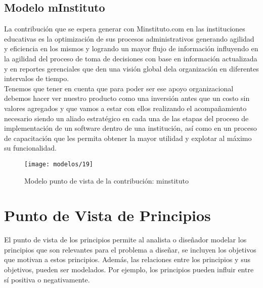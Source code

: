    \subsection{Modelo mInstituto}
  La contribución que se espera generar con Minstituto.com en las instituciones educativas es la optimización de sus procesos administrativos generando agilidad y eficiencia en los mismos y logrando un mayor flujo de información influyendo en la agilidad del proceso de toma de decisiones con base en información actualizada y en reportes gerenciales que den una visión global dela organización en diferentes intervalos de tiempo. \\
  
  Tenemos que tener en cuenta que para poder ser ese apoyo organizacional debemos hacer ver nuestro producto como una inversión antes que un costo sin valores agregados y que vamos a estar con ellos realizando el acompañamiento necesario siendo un aliado estratégico en cada una de las etapas del proceso de implementación de un software dentro de una institución, así como en un proceso de capacitación que les permita obtener la mayor utilidad y explotar al máximo su funcionalidad.
  
   \begin{figure}[H]
   	\centering
   	\texttt{[image: modelos/19]}
   	\captionsetup{width=.95\textwidth}
   	\caption{Modelo punto de vista de la contribución: minstituto}
   	\label{modelo19}
   \end{figure}
   
\section{Punto de Vista de Principios}
El punto de vista de los principios permite al analista o diseñador modelar los principios que son relevantes para el problema a diseñar, se incluyen los objetivos que motivan a estos principios. Además, las relaciones entre los principios y sus objetivos, pueden ser modelados. Por ejemplo, los principios pueden influir entre sí positiva o negativamente. \cite{ref9}
   
